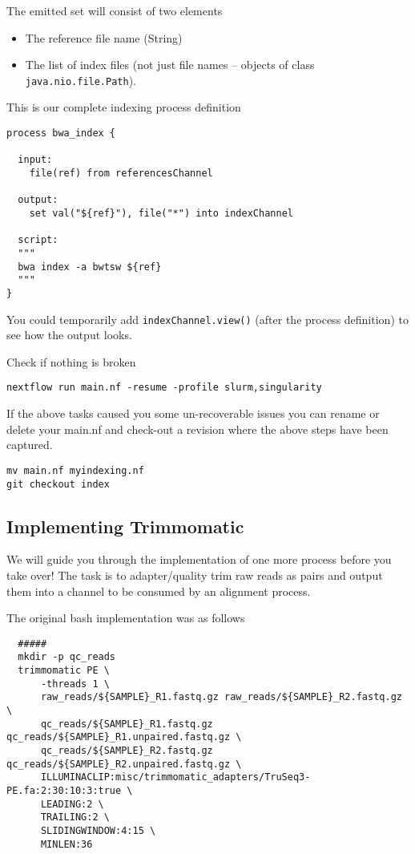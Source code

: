 The emitted set will consist of two elements 
\begin{itemize}
\item The reference file name (String) 
\item The list of index files (not just file names -- objects of class \texttt{java.nio.file.Path}).
\end{itemize}

This is our complete indexing process definition 
\begin{lstlisting}
process bwa_index {
  
  input:
    file(ref) from referencesChannel
  
  output:
    set val("${ref}"), file("*") into indexChannel 
    
  script:
  """
  bwa index -a bwtsw ${ref}
  """
}  
\end{lstlisting}

You could temporarily add \texttt{indexChannel.view()} (after the process definition) to see how the output looks. 


\begin{steps}
Check if nothing is broken 
\begin{lstlisting}
nextflow run main.nf -resume -profile slurm,singularity
\end{lstlisting}
\end{steps}

\begin{note}
If the above tasks caused you some un-recoverable issues you can rename or delete your main.nf and check-out a revision where the above steps have been captured.
\begin{lstlisting}
mv main.nf myindexing.nf
git checkout index
\end{lstlisting}
\end{note}


\subsection{Implementing Trimmomatic}

We will guide you through the implementation of one more process before you take over!
The task is to adapter/quality trim raw reads as pairs and output them into a channel 
to be consumed by an alignment process.

The original bash implementation was as follows

\begin{lstlisting}
  #####
  mkdir -p qc_reads
  trimmomatic PE \
      -threads 1 \
      raw_reads/${SAMPLE}_R1.fastq.gz raw_reads/${SAMPLE}_R2.fastq.gz \
      qc_reads/${SAMPLE}_R1.fastq.gz qc_reads/${SAMPLE}_R1.unpaired.fastq.gz \
      qc_reads/${SAMPLE}_R2.fastq.gz qc_reads/${SAMPLE}_R2.unpaired.fastq.gz \
      ILLUMINACLIP:misc/trimmomatic_adapters/TruSeq3-PE.fa:2:30:10:3:true \
      LEADING:2 \
      TRAILING:2 \
      SLIDINGWINDOW:4:15 \
      MINLEN:36
\end{lstlisting}

